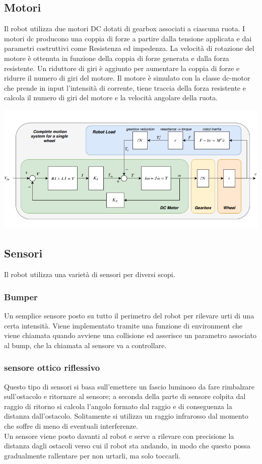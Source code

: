 \documentclass{article}
\begin{document}
\subsection{Motori}
Il robot utilizza due motori DC dotati di gearbox associati a ciascuna ruota. I motori dc producono una coppia di forze a partire dalla tensione applicata e dai parametri costruttivi come Resistenza ed impedenza. La velocità di rotazione del motore è ottenuta in funzione della coppia di forze generata e dalla forza resistente. Un riduttore di giri è aggiunto per aumentare la coppia di forze e ridurre il numero di giri del motore.
Il motore è simulato con la classe dc-motor che prende in input l'intensità di corrente, tiene traccia della forza resistente e calcola il numero di giri del motore e la velocità angolare della ruota.

\includegraphics[scale=0.4]{media/schema motore.png}
\subsection{Sensori}
Il robot utilizza una varietà di sensori per diversi scopi.
\subsubsection{Bumper}
Un semplice sensore posto su tutto il perimetro del robot per rilevare urti di una certa intensità. Viene implementato tramite una funzione di environment che viene chiamata quando avviene una collisione ed asserisce un parametro associato al bump, che la chiamata al sensore va a controllare.

\subsubsection{sensore ottico riflessivo}
Questo tipo di sensori si basa sull'emettere un fascio luminoso da fare rimbalzare sull'ostacolo e ritornare al sensore; a seconda della parte di sensore colpita dal raggio di ritorno si calcola l'angolo formato dal raggio e di conseguenza la distanza dall'ostacolo. Solitamente si utilizza un raggio infrarosso dal momento che soffre di meno di eventuali interferenze.\\
Un sensore viene posto davanti al robot e serve a rilevare con precisione la distanza dagli ostacoli verso cui il robot sta andando, in modo che questo possa gradualmente rallentare per non urtarli, ma solo toccarli.
\end{document}
